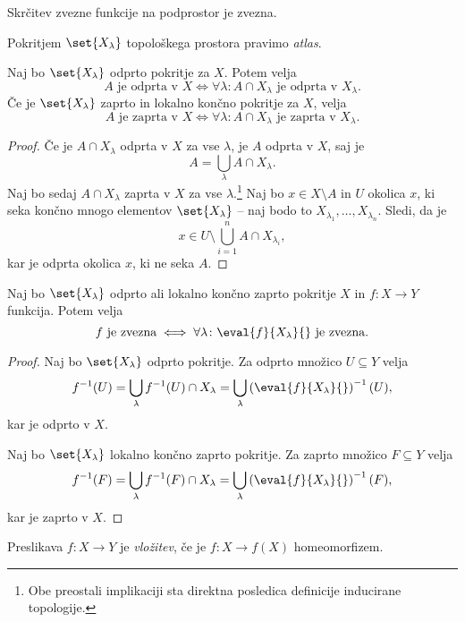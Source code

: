 \obvs

\begin{trditev}
Skrčitev zvezne funkcije na podprostor je zvezna.
\end{trditev}

\obvs

\begin{definicija}
Pokritjem $\set{X_\lambda}$ topološkega prostora pravimo
\emph{atlas}.
\end{definicija}

\begin{izrek}
Naj bo $\set{X_\lambda}$ odprto pokritje za $X$. Potem velja
\[
\text{$A$ je odprta v $X$} \iff \forall \lambda \colon
\text{$A \cap X_\lambda$ je odprta v $X_\lambda$}.
\]
Če je $\set{X_\lambda}$ zaprto in lokalno končno pokritje za $X$,
velja
\[
\text{$A$ je zaprta v $X$} \iff \forall \lambda \colon
\text{$A \cap X_\lambda$ je zaprta v $X_\lambda$}.
\]
\end{izrek}

\begin{proof}
Če je $A \cap X_\lambda$ odprta v $X$ za vse $\lambda$, je $A$
odprta v $X$, saj je
\[
A = \bigcup_\lambda A \cap X_\lambda.
\]
Naj bo sedaj $A \cap X_\lambda$ zaprta v $X$ za vse $\lambda$.\footnote{
Obe preostali implikaciji sta direktna posledica definicije
inducirane topologije.} Naj bo $x \in X \setminus A$ in $U$ okolica
$x$, ki seka končno mnogo elementov $\set{X_\lambda}$ -- naj bodo
to $X_{\lambda_1}, \dots, X_{\lambda_n}$. Sledi, da je
\[
x \in U \setminus \bigcup_{i=1}^n A \cap X_{\lambda_i},
\]
kar je odprta okolica $x$, ki ne seka $A$.
\end{proof}

\begin{izrek}
Naj bo $\set{X_\lambda}$ odprto ali lokalno končno zaprto pokritje
$X$ in $f \colon X \to Y$ funkcija. Potem velja
\[
\text{$f$ je zvezna} \iff \forall \lambda \colon
\text{$\eval{f}{X_\lambda}{}$ je zvezna}.
\]
\end{izrek}

\begin{proof}
Naj bo $\set{X_\lambda}$ odprto pokritje. Za odprto množico
$U \subseteq Y$ velja
\[
f^{-1}(U) =
\bigcup_\lambda f^{-1}(U) \cap X_\lambda =
\bigcup_\lambda \left(\eval{f}{X_\lambda}{}\right)^{-1}(U),
\]
kar je odprto v $X$.

Naj bo $\set{X_\lambda}$ lokalno končno zaprto pokritje. Za zaprto
množico $F \subseteq Y$ velja
\[
f^{-1}(F) =
\bigcup_\lambda f^{-1}(F) \cap X_\lambda =
\bigcup_\lambda \left(\eval{f}{X_\lambda}{}\right)^{-1}(F),
\]
kar je zaprto v $X$.
\end{proof}

\begin{definicija}
Preslikava $f \colon X \to Y$ je
\emph{vložitev}, če je
$f \colon X \to f(X)$ homeomorfizem.
\end{definicija}
